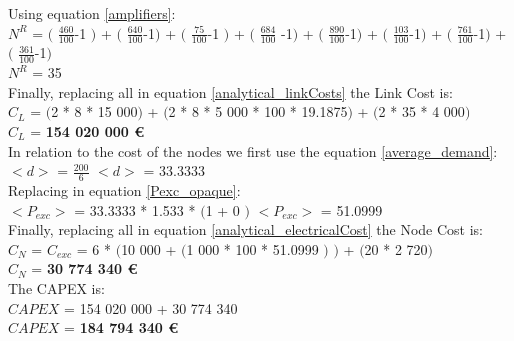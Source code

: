 Using equation \ref{amplifiers}:\\

$N^R$ = $($ $\frac{460}{100}$-1 $)$ + $($ $\frac{640}{100}$-1$)$ + $($ $\frac{75}{100}$-1 $)$ + $($ $\frac{684}{100}$ -1$)$ + $($ $\frac{890}{100}$-1$)$ + $($ $\frac{103}{100}$-1$)$ + $($ $\frac{761}{100}$-1$)$ + $($ $\frac{361}{100}$-1$)$\\

$N^R$ = 35\\

Finally, replacing all in equation \ref{analytical_linkCosts} the Link Cost is:\\

$C_L$ = $($2 * 8 * 15 000$)$ + $($2 * 8 * 5 000 * 100 * 19.1875$)$ + $($2 * 35 * 4 000$)$\\

$C_L$ = \textbf{154 020 000 \euro}\\

In relation to the cost of the nodes we first use the equation \ref{average_demand}:\\

$<d>$ = $\frac{200}{6}$ \qquad \qquad $<d>$ = 33.3333\\

Replacing in equation \ref{Pexc_opaque}:\\

$<P_{exc}>$ = 33.3333 * 1.533 * $($1 + $0$ $)$ \qquad \qquad $<P_{exc}>$ = 51.0999 \\

Finally, replacing all in equation \ref{analytical_electricalCost} the Node Cost is:\\

$C_N$ = $C_{exc}$ = 6 * $($10 000 + $($1 000 * 100 * 51.0999 $)$ $)$ + $($20 * 2 720$)$\\

$C_N$ = \textbf{30 774 340 \euro}\\

The CAPEX is:\\
$CAPEX$ = 154 020 000 + 30 774 340\\

$CAPEX$ = \textbf{184 794 340 \euro}\\

